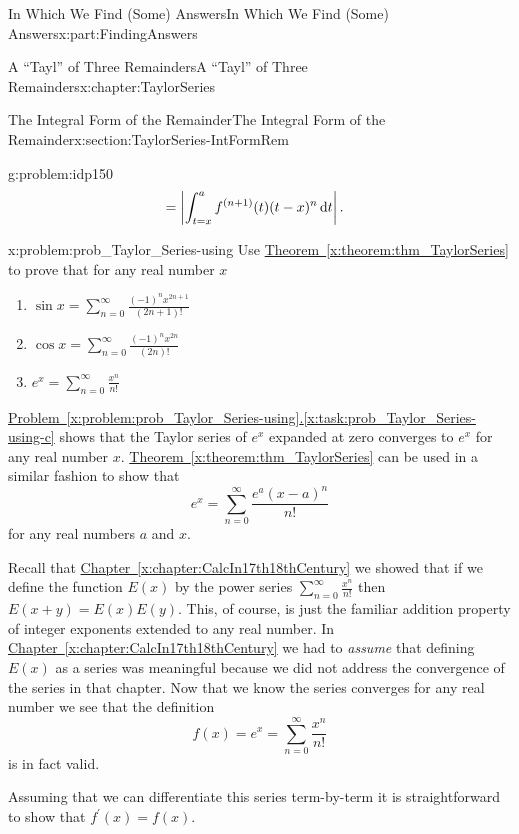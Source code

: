 \documentclass[oneside,10pt,]{book}
\newcommand{\xreffont}{\relax}
\numberwithin{equation}{section}
\newcommand{\dx}[1]{\,{\rm d}#1}
\newcommand{\amp}{&}
\begin{document}
\begin{partptx}{In Which We Find (Some) Answers}{}{In Which We Find (Some) Answers}{}{}{x:part:FindingAnswers}
\begin{chapterptx}{A ``Tayl'' of Three Remainders}{}{A ``Tayl'' of Three Remainders}{}{}{x:chapter:TaylorSeries}
\begin{sectionptx}{The Integral Form of the Remainder}{}{The Integral Form of the Remainder}{}{}{x:section:TaylorSeries-IntFormRem}
\begin{problem}{}{g:problem:idp150}
\begin{align*}
\amp =\left|\int_{t=x}^af^{(n+1)}(t)(t-x)^n\dx{ t}\right|.
\end{align*}
%
\end{problem}
\begin{problem}{}{x:problem:prob_Taylor_Series-using}%
Use \hyperref[x:theorem:thm_TaylorSeries]{Theorem~{\xreffont\ref{x:theorem:thm_TaylorSeries}}} to prove that for any real number \(x\)%
\begin{enumerate}[font=\bfseries,label=(\alph*),ref=\alph*]
\item{}\(\displaystyle\sin x=\sum_{n=0}^\infty\frac{(-1)^nx^{2n+1}}{(2n+1)!}\)%
\item{}\(\displaystyle\cos x= \sum_{n=0}^\infty\frac{(-1)^nx^{2n}}{(2n)!}\)%
\item\label{x:task:prob_Taylor_Series-using-c}\(\displaystyle e^x=\sum_{n=0}^\infty\frac{x^n}{n!}\)%
\end{enumerate}
\end{problem}
\hyperref[x:task:prob_Taylor_Series-using-c]{Problem~{\xreffont\ref{x:problem:prob_Taylor_Series-using}}.{\xreffont\ref{x:task:prob_Taylor_Series-using-c}}} shows that the Taylor series of \(e^x\) expanded at zero converges to \(e^x\) for any real number \(x\). \hyperref[x:theorem:thm_TaylorSeries]{Theorem~{\xreffont\ref{x:theorem:thm_TaylorSeries}}} can be used in a similar fashion to show that%
\begin{equation*}
e^x=\sum_{n=0}^\infty\frac{e^a(x-a)^n}{n!}
\end{equation*}
for any real numbers \(a\) and \(x\).%
\par
Recall that \hyperref[x:chapter:CalcIn17th18thCentury]{Chapter~{\xreffont\ref{x:chapter:CalcIn17th18thCentury}}} we showed that if we define the function \(E(x)\) by the power series \(\sum_{n=0}^\infty\frac{x^n}{n!}\) then \(E(x+y)=E(x)E(y)\). This, of course, is just the familiar addition property of integer exponents extended to any real number. In \hyperref[x:chapter:CalcIn17th18thCentury]{Chapter~{\xreffont\ref{x:chapter:CalcIn17th18thCentury}}} we had to \emph{assume} that defining \(E(x)\) as a series was meaningful because we did not address the convergence of the series in that chapter. Now that we know the series converges for any real number we see that the definition%
\begin{equation*}
f(x) = e^x = \sum_{n=0}^\infty\frac{x^n}{n!}
\end{equation*}
is in fact valid.%
\par
Assuming that we can differentiate this series term-by-term it is straightforward to show that \(f^\prime(x) = f(x)\).%

\end{sectionptx}
\end{chapterptx}
\end{partptx}
\end{document}
